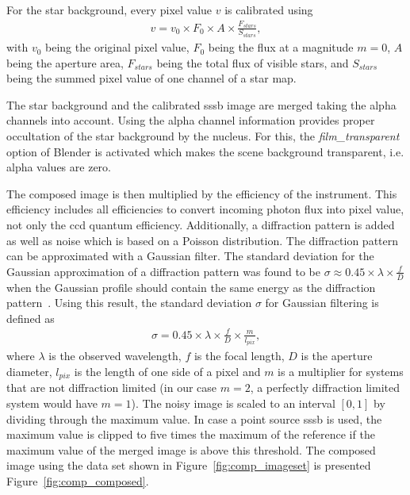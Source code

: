 For the star background, every pixel value $v$ is calibrated using
\begin{align}
        v = v_0 \times F_0 \times A \times \frac{F_{stars}}{S_{stars}}, \label{eq:comp_cal_starmap}
\end{align}
with $v_0$ being the original pixel value, $F_0$ being the flux at a magnitude $m = 0$, $A$ being the aperture area, $F_{stars}$ being the total flux of visible stars, and $S_{stars}$ being the summed pixel value of one channel of a star map.

The star background and the calibrated \gls{sssb} image are merged taking the alpha channels into account. Using the alpha channel information provides proper occultation of the star background by the nucleus. For this, the \textit{film\_transparent} option of Blender is activated which makes the scene background transparent, i.e. alpha values are zero.

The composed image is then multiplied by the efficiency of the instrument. This efficiency includes all efficiencies to convert incoming photon flux into pixel value, not only the \gls{ccd} quantum efficiency. Additionally, a diffraction pattern is added as well as noise which is based on a Poisson distribution. The diffraction pattern can be approximated with a Gaussian filter. The standard deviation for the Gaussian approximation of a diffraction pattern was found to be $\sigma \approx 0.45 \times \lambda \times \frac{f}{D}$ when the Gaussian profile should contain the same energy as the diffraction pattern~\cite{Zhang2007GaussianModels}. Using this result, the standard deviation $\sigma$ for Gaussian filtering is defined as
\begin{align}
    \sigma = 0.45 \times \lambda \times \frac{f}{D} \times \frac{m}{l_{pix}}, \label{eq:comp_sigma}
\end{align}
where $\lambda$ is the observed wavelength, $f$ is the focal length, $D$ is the aperture diameter, $l_{pix}$ is the length of one side of a pixel and $m$ is a multiplier for systems that are not diffraction limited (in our case $m = 2$, a perfectly diffraction limited system would have $m = 1$). The noisy image is scaled to an interval $[0,1]$ by dividing through the maximum value. In case a point source \gls{sssb} is used, the maximum value is clipped to five times the maximum of the reference if the maximum value of the merged image is above this threshold. The composed image using the data set shown in Figure~\ref{fig:comp_imageset} is presented Figure~\ref{fig:comp_composed}.

